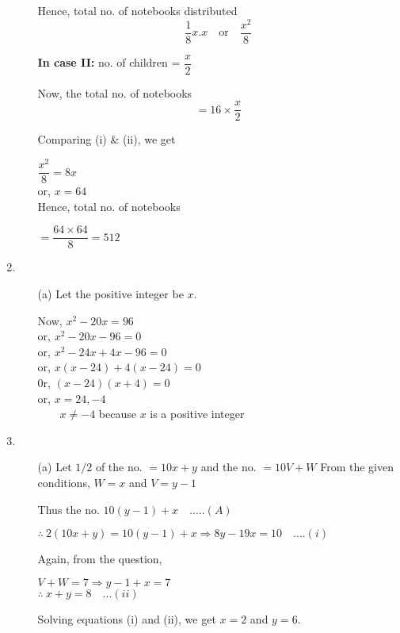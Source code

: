 \begin{multicols}{2}
\begin{enumerate}
\begin{itemize}
    Hence, total no. of notebooks distributed
    \begin{equation*}
      \dfrac{1}{8} x . x \quad\text{or}\quad \dfrac{x^2}{8}\tag*{.....(i)}
    \end{equation*}

    \textbf{In case II:} no. of children = $\dfrac{x}{2}$

    Now, the total no. of notebooks
    \begin{equation*}
      = 16 \times \dfrac{x}{2}\tag*{....(ii)}
    \end{equation*}

    Comparing (i) \& (ii), we get
    
    $\dfrac{x^2}{8} = 8x$\\
    or, $x = 64$\\
    Hence, total no. of notebooks

    $= \dfrac{64 \times 64}{8} = 512$
  \end{itemize}
\item
  \begin{itemize}
  \item[(a)] Let the positive integer be $x$.

    Now, $x^2 - 20x = 96$\\
    or, $x^2 - 20x - 96 = 0$\\
    or, $x^2 - 24x + 4x - 96 = 0$\\
    or, $x(x - 24) + 4(x - 24) = 0$\\
    0r, $(x - 24)(x + 4) = 0$\\
    or, $x = 24, -4$\\
    $\qquad x \neq -4$ because $x$ is a positive integer
  \end{itemize}
\item
  \begin{itemize}
  \item[(a)] Let $1/2$ of the no. $= 10x + y$ and the no. $= 10V + W$ From the given conditions, $W = x$ and $V = y - 1$

    Thus the no. $10(y - 1)+ x \quad .....(A)$

    $\therefore~ 2(10x + y) = 10(y - 1) + x \Rightarrow 8y - 19x = 10 \quad ....(i)$

    Again, from the question,

    $V + W = 7 \Rightarrow y - 1 + x = 7$\\
    $\therefore~ x + y = 8\quad ...(ii)$

    Solving equations (i) and (ii), we get $x = 2$ and $y = 6$.


\end{itemize}
\end{enumerate}
\end{multicols}
